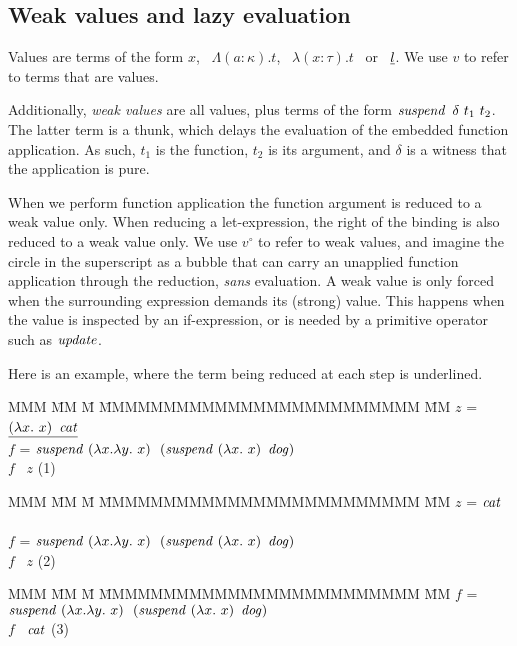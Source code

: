 
\subsection{Weak values and lazy evaluation}
Values are terms of the form $x$, \ $\Lambda (a:\kappa). t$, 
\ $\lambda (x:\tau). t$ \ or \ $\underline{l}$. We use $v$ to refer to terms that are values.

Additionally, \emph{weak values} are all values, plus terms of the form $\operatorname{\mathit{suspend}} \ \delta \ t_1 \ t_2$. The latter term is a thunk, which delays the evaluation of the embedded function application. As such, $t_1$ is the function, $t_2$ is its argument, and $\delta$ is a witness that the application is pure.

When we perform function application the function argument is reduced to a weak value only. When reducing a let-expression, the right of the binding is also reduced to a weak value only. We use $v^\circ$ to refer to weak values, and imagine the circle in the superscript as a bubble that can carry an unapplied function application through the reduction, \emph{sans} evaluation. A weak value is only forced when the surrounding expression demands its (strong) value. This happens when the value is inspected by an if-expression, or is needed by a primitive operator such as $\operatorname{\mathit{update}}$.

Here is an example, where the term being reduced at each step is underlined.

\begin{tabbing}
MMM 	\= MM  	  \= M \= MMMMMMMMMMMMMMMMMMMMMMMMM \= MM \kill
	\> \rblet \> $z$  \> = $\underline{(\lambda x. \ x) \ \operatorname{\mathit{cat}}}$ \ \rbin \\
	\> \rblet \> $f$  \> = $\isuspend \ (\lambda x. \lambda y. \ x) \ \ 
					(\isuspend \ (\lambda x. \ x) \ \idog)$  \\
	\> \rbin  \> $f$ \ $z$ 
	\> \> (1)
\end{tabbing}

\vspace{-2em}
\begin{tabbing}
MMM 	\= MM  	  \= M \= MMMMMMMMMMMMMMMMMMMMMMMMM \= MM \kill
\eto	\> \un{\rblet} 
			\> $z$  \> = $\operatorname{\mathit{cat}}$ \ \rbin \\
	\> \rblet \> $f$  \> = $\isuspend \ (\lambda x. \lambda y. \ x) \ \ 
					(\isuspend \ (\lambda x. \ x) \ \idog)$  \\
	\> \rbin  \> $f$ \ $z$
	\> \> (2)
\end{tabbing}

\vspace{-2em}
\begin{tabbing}
MMM 	\= MM  	  \= M \= MMMMMMMMMMMMMMMMMMMMMMMMM \= MM \kill
\eto	\> \un{\rblet} 
			\> $f$  \> = $\isuspend \ (\lambda x. \lambda y. \ x) \ \ 
					(\isuspend \ (\lambda x. \ x) \ \idog)$  \\
	\> \rbin  \> $f$ \ $\operatorname{\mathit{cat}}$ 
	\> \> (3)
\end{tabbing}

